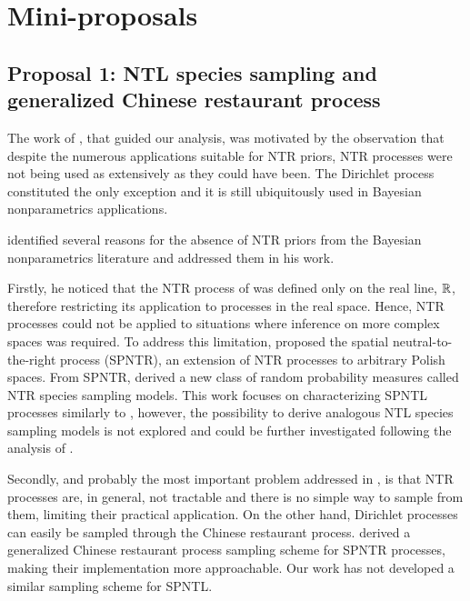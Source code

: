 

\section{Mini-proposals}  \label{proposals}

\subsection{Proposal 1: NTL species sampling and generalized Chinese restaurant process} %

The work of \cite{james2006poisson}, that guided our analysis, was motivated by the observation that despite the numerous applications suitable for NTR priors, NTR processes were not being used as extensively as they could have been. The Dirichlet process constituted the only exception and it is still ubiquitously used in Bayesian nonparametrics applications. 

\cite{james2006poisson} identified several reasons for the absence of NTR priors from the Bayesian nonparametrics literature and addressed them in his work.

Firstly, he noticed that the NTR process of \cite{doksum1974tailfree} was defined only on the real line, $\mathbb{R}$, therefore restricting its application to processes in the real space. Hence, NTR processes could not be applied to situations where inference on more complex spaces was required. To address this limitation, \cite{james2006poisson} proposed the spatial neutral-to-the-right process (SPNTR), an extension of NTR processes to arbitrary Polish spaces. From SPNTR, \cite{james2006poisson} derived a new class of random probability measures called NTR species sampling models. This work focuses on characterizing SPNTL processes similarly to \cite{james2006poisson}, however, the possibility to derive analogous NTL species sampling models is not explored and could be further investigated following the analysis of \cite{james2006poisson}.

Secondly, and probably the most important problem addressed in \cite{james2006poisson}, is that NTR processes are, in general, not tractable and there is no simple way to sample from them, limiting their practical application. On the other hand, Dirichlet processes can easily be sampled through the Chinese restaurant process. \cite{james2006poisson} derived a generalized Chinese restaurant process sampling scheme for SPNTR processes, making their implementation more approachable. Our work has not developed a similar sampling scheme for SPNTL.

